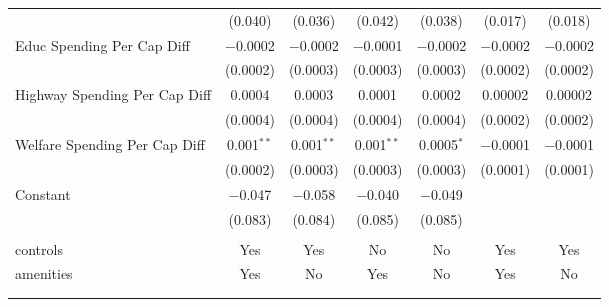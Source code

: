 \begin{table}[!htbp]
\begin{tabular}{@{\extracolsep{5pt}}lcccccc}
  & (0.040) & (0.036) & (0.042) & (0.038) & (0.017) & (0.018) \\ 
  Educ Spending Per Cap Diff & $-$0.0002 & $-$0.0002 & $-$0.0001 & $-$0.0002 & $-$0.0002 & $-$0.0002 \\ 
  & (0.0002) & (0.0003) & (0.0003) & (0.0003) & (0.0002) & (0.0002) \\ 
  Highway Spending Per Cap Diff & 0.0004 & 0.0003 & 0.0001 & 0.0002 & 0.00002 & 0.00002 \\ 
  & (0.0004) & (0.0004) & (0.0004) & (0.0004) & (0.0002) & (0.0002) \\ 
  Welfare Spending Per Cap Diff & 0.001$^{**}$ & 0.001$^{**}$ & 0.001$^{**}$ & 0.0005$^{*}$ & $-$0.0001 & $-$0.0001 \\ 
  & (0.0002) & (0.0003) & (0.0003) & (0.0003) & (0.0001) & (0.0001) \\ 
  Constant & $-$0.047 & $-$0.058 & $-$0.040 & $-$0.049 &  &  \\ 
  & (0.083) & (0.084) & (0.085) & (0.085) &  &  \\ 
 \hline \\[-1.8ex] 
controls & Yes & Yes & No & No & Yes & Yes \\ 
amenities & Yes & No & Yes & No & Yes & No \\ 
\hline \\[-1.8ex] 
\hline 
\hline \\[-1.8ex] 
\end{tabular} 
\end{table} 
